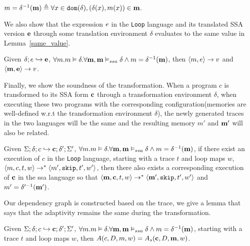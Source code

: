 \begin{defn}
 $m = \delta^{-1}({\bf{{m}}}) \triangleq \forall x \in \mathtt{dom}(\delta), (\delta(x), m(x)) \in {\bf{{m}}} $.
\end{defn}

We also show that the expression $e$ in the {\tt Loop} language and its translated SSA version ${\bf{{e}}}$ through some translation environment $\delta$ evaluates to the same value in Lemma~\ref{same_value}. 
%
\begin{lem}
\label{same_value}
Given $\delta; e \hookrightarrow {\bf{{e}}}$,  $\forall m. m \vDash \delta. \forall {\bf{{m}}}, {\bf{{m}}} \vDash_{ssa} \delta \land m = \delta^{-1}({\bf{{m}}})$, then $\langle m, e \rangle \to v $ and $\langle 
{\bf{{m}}}, {\bf{{e}}} \rangle \to {v}$.  
\end{lem}

Finally, we show the soundness of the transformation. When a program $c$ is transformed to its SSA form ${\bf{{c}}}$ through a transformation environment $\delta$, when executing these two programs with the corresponding configuration(memories are well-defined w.r.t the transformation environment $\delta$), the newly generated traces in the two languages will be the same and the resulting memory $m'$ and ${\bf{{m'}}}$ will also be related. 

\begin{thm}
\label{thm:sound_trans}
Given $\Sigma; \delta ; c \hookrightarrow {\bf{{c}}} ; \delta';\Sigma' $, $\forall m. m \vDash \delta. \forall {\bf{{m}}}, {\bf{{m}}} \vDash_{ssa} \delta \land m = \delta^{-1}({\bf{{m}}})$, if there exist an execution of $c$ in the {\tt Loop} language, starting with a trace $t$ and loop maps $w$, $\langle m, c, t, w \rangle \to^{*} \langle m', \mathtt{skip}, t', w'  \rangle $,  then there also exists a corresponding execution of ${\bf{{c}}}$ in the ssa language so that 
  $\langle   {{\bf{{m}}}}, {\bf{{c}}}, t, w \rangle \to^{*} \langle {  {\bf{{m'}}}}, \mathtt{skip}, t', w'  \rangle $ and $ m' = \delta'^{-1}({\bf{{m'}}}) $.
\end{thm}

Our dependency graph is constructed based on the trace, we give a lemma that says that the adaptivity remains the same during the transformation.
\begin{lem}
\label{lem:same_adapt}
Given $\Sigma; \delta ; c \hookrightarrow {\bf{{c}}} ; \delta';\Sigma' $, $\forall m. m \vDash \delta. \forall {\bf{{m}}}, {\bf{{m}}} \vDash_{ssa} \delta \land m = \delta^{-1}({\bf{{m}}})$, starting with a trace $t$ and loop maps $w$, then $A(c,D,m,w) = A_s({\bf{{c}}},D,{\bf{{m}}},w) $.
\end{lem}




